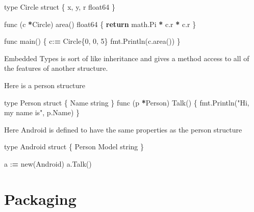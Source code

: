 \documentclass[]{book}
\newenvironment{Shaded}{\begin{snugshade}}{\end{snugshade}}
\newcommand{\DecValTok}[1]{\textcolor[rgb]{0.00,0.00,0.81}{#1}}
\newcommand{\StringTok}[1]{\textcolor[rgb]{0.31,0.60,0.02}{#1}}
\newcommand{\ControlFlowTok}[1]{\textcolor[rgb]{0.13,0.29,0.53}{\textbf{#1}}}
\newcommand{\OperatorTok}[1]{\textcolor[rgb]{0.81,0.36,0.00}{\textbf{#1}}}
\newcommand{\BuiltInTok}[1]{#1}
\newcommand{\NormalTok}[1]{#1}
\begin{document}
\begin{Shaded}
\begin{Highlighting}[]
\BuiltInTok{type}\NormalTok{ Circle struct \{             }
\NormalTok{    x, y, r float64              }
\NormalTok{\}                                }
                                 
\NormalTok{func (c }\OperatorTok{*}\NormalTok{Circle) area() float64 \{}
    \ControlFlowTok{return}\NormalTok{ math.Pi }\OperatorTok{*}\NormalTok{ c.r }\OperatorTok{*}\NormalTok{ c.r   }
\NormalTok{\}                                }
                                 
\NormalTok{func main() \{                    }
\NormalTok{    c:}\OperatorTok{=}\NormalTok{ Circle\{}\DecValTok{0}\NormalTok{, }\DecValTok{0}\NormalTok{, }\DecValTok{5}\NormalTok{\}          }
\NormalTok{    fmt.Println(c.area())        }
\NormalTok{\}   }
\end{Highlighting}
\end{Shaded}

Embedded Types is sort of like inheritance and gives a method access to
all of the features of another structure.

Here is a person structure

\begin{Shaded}
\begin{Highlighting}[]
\BuiltInTok{type}\NormalTok{ Person struct \{}
\NormalTok{  Name string}
\NormalTok{\}}
\NormalTok{func (p }\OperatorTok{*}\NormalTok{Person) Talk() \{}
\NormalTok{  fmt.Println(}\StringTok{"Hi, my name is"}\NormalTok{, p.Name)}
\NormalTok{\}}
\end{Highlighting}
\end{Shaded}

Here Android is defined to have the same properties as the person
structure

\begin{Shaded}
\begin{Highlighting}[]
\BuiltInTok{type}\NormalTok{ Android struct \{}
\NormalTok{  Person}
\NormalTok{  Model string}
\NormalTok{\}}

\NormalTok{a :}\OperatorTok{=}\NormalTok{ new(Android)}
\NormalTok{a.Talk()}
\end{Highlighting}
\end{Shaded}

\section{Packaging}\label{packaging}
\end{document}

